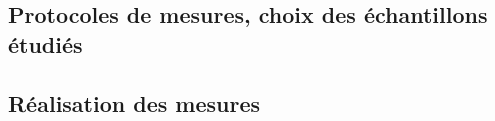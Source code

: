 
\subsection{Protocoles de mesures, choix des échantillons étudiés}

\subsection{Réalisation des mesures}
